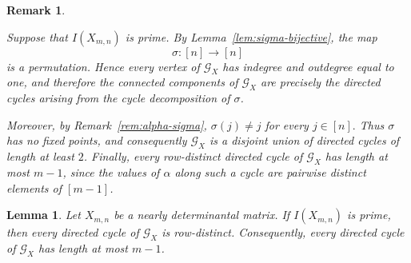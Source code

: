 \documentclass[12pt]{amsart}
\numberwithin{equation}{section}
\newtheorem{Lemma}[Theorem]{Lemma}
\newtheorem{Remark}[Theorem]{Remark}
\begin{document}


\begin{Remark}\label{rem:sigma-cycles}
{\em 
Suppose that $I(X_{m,n})$ is prime. By Lemma~\ref{lem:sigma-bijective}, the map
\[
\sigma:[n]\longrightarrow[n]
\]
is a permutation. Hence every vertex of $\mathcal G_X$ has indegree and outdegree equal to one, and therefore the connected components of $\mathcal G_X$ are precisely the directed cycles arising from the
cycle decomposition of $\sigma$.

Moreover, by Remark~\ref{rem:alpha-sigma}, $\sigma(j)\neq j$ for every $j\in[n].$ Thus $\sigma$ has no fixed points, and consequently
$\mathcal G_X$ is a disjoint union of directed cycles of length at least $2$. Finally, every row-distinct directed cycle of $\mathcal G_X$ has length at most $m-1$, since the values of $\alpha$ along such a cycle are pairwise distinct elements of $[m-1]$.
}
\end{Remark}




\begin{Lemma}\label{lem:cycles-row-distinct}
Let $X_{m,n}$ be a nearly determinantal matrix. If $I(X_{m,n})$ is
prime, then every directed cycle of $\mathcal{G}_X$ is row-distinct.
Consequently, every directed cycle of $\mathcal{G}_X$ has length at
most $m-1$.
\end{Lemma}
\end{document}
